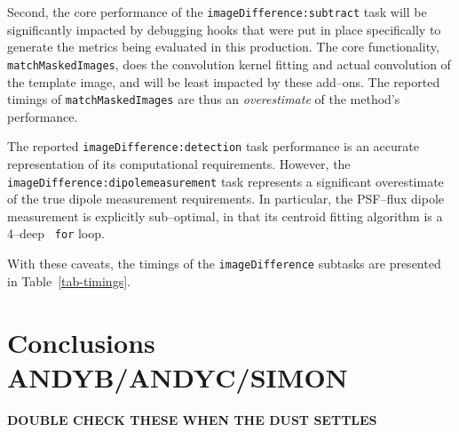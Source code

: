 \documentclass[prd, nofootinbib, floatfix, 11pt,tightenlines,times]{article}
\begin{document}
Second, the core performance of the {\tt imageDifference:subtract}
task will be significantly impacted by debugging hooks that were put
in place specifically to generate the metrics being evaluated in this
production.  The core functionality, {\tt matchMaskedImages}, does the
convolution kernel fitting and actual convolution of the template
image, and will be least impacted by these add--ons.  The reported
timings of {\tt matchMaskedImages} are thus an {\it overestimate} of
the method's performance.

The reported {\tt imageDifference:detection} task performance is an
accurate representation of its computational requirements.  However,
the {\tt imageDifference:dipolemeasurement} task represents a
significant overestimate of the true dipole measurement requirements.
In particular, the PSF--flux dipole measurement is explicitly
sub--optimal, in that its centroid fitting algorithm is a 4--deep {\tt
  for} loop.

With these caveats, the timings of the {\tt imageDifference} subtasks
are presented in Table~\ref{tab-timings}.

\section{Conclusions {\bf ANDYB/ANDYC/SIMON}}

{\bf DOUBLE CHECK THESE WHEN THE DUST SETTLES}
\end{document}
